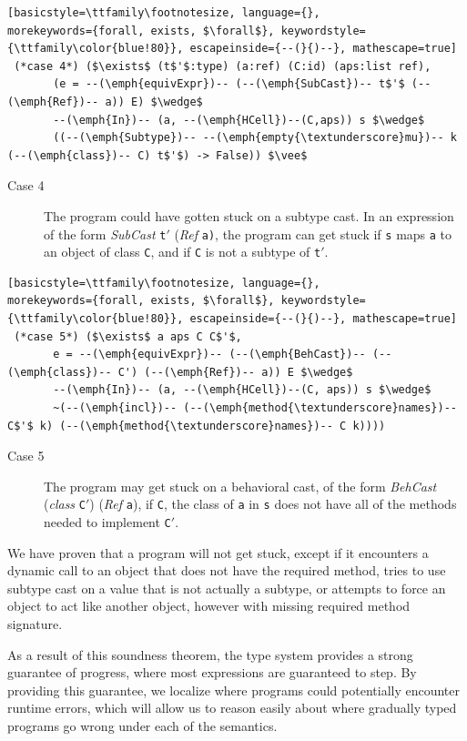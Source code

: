 \documentclass[runnningheads]{tex/llncs}
\begin{document}
\begin{lstlisting}[basicstyle=\ttfamily\footnotesize, language={}, 
morekeywords={forall, exists, $\forall$}, keywordstyle={\ttfamily\color{blue!80}}, escapeinside={--(}{)--}, mathescape=true]
 (*case 4*) ($\exists$ (t$'$:type) (a:ref) (C:id) (aps:list ref),
       (e = --(\emph{equivExpr})-- (--(\emph{SubCast})-- t$'$ (--(\emph{Ref})-- a)) E) $\wedge$
       --(\emph{In})-- (a, --(\emph{HCell})--(C,aps)) s $\wedge$
       ((--(\emph{Subtype})-- --(\emph{empty{\textunderscore}mu})-- k (--(\emph{class})-- C) t$'$) -> False)) $\vee$
\end{lstlisting}
\begin{description}
  \item[Case 4] The program could have gotten stuck on a subtype cast. 
In an expression of the form \emph{SubCast} \texttt{t$'$} (\emph{Ref} \texttt{a)}, the program
can get stuck if \verb|s| maps \verb|a| to an object of class \verb|C|,
and if \verb|C| is not a subtype of \verb|t|$'$.
\end{description}

\begin{lstlisting}[basicstyle=\ttfamily\footnotesize, language={}, 
morekeywords={forall, exists, $\forall$}, keywordstyle={\ttfamily\color{blue!80}}, escapeinside={--(}{)--}, mathescape=true]
 (*case 5*) ($\exists$ a aps C C$'$, 
       e = --(\emph{equivExpr})-- (--(\emph{BehCast})-- (--(\emph{class})-- C') (--(\emph{Ref})-- a)) E $\wedge$
       --(\emph{In})-- (a, --(\emph{HCell})--(C, aps)) s $\wedge$
       ~(--(\emph{incl})-- (--(\emph{method{\textunderscore}names})-- C$'$ k) (--(\emph{method{\textunderscore}names})-- C k))))
\end{lstlisting}
\begin{description}
  \item[Case 5] The program may get stuck on a behavioral cast, of the form
\emph{BehCast} (\emph{class} \texttt{C}$'$) (\emph{Ref} \texttt{a}), if \verb|C|, the class of \verb|a| in
\verb|s| does not have all of the methods needed to implement \verb|C|$'$.
\end{description}

We have proven that a \kafka program will not get stuck, except if it
encounters a dynamic call to an object that does not have the required method,
tries to use subtype cast on a value that is not actually a subtype, or attempts
to force an object to act like another object, however with missing required 
method signature. 

As a result of this soundness theorem, the \kafka type system provides a
strong guarantee of progress, where most expressions are guaranteed to step.
By providing this guarantee, we localize where \kafka programs could
potentially encounter runtime errors, which will allow us to reason easily
about where gradually typed programs go wrong under each of the semantics.
\end{document}
